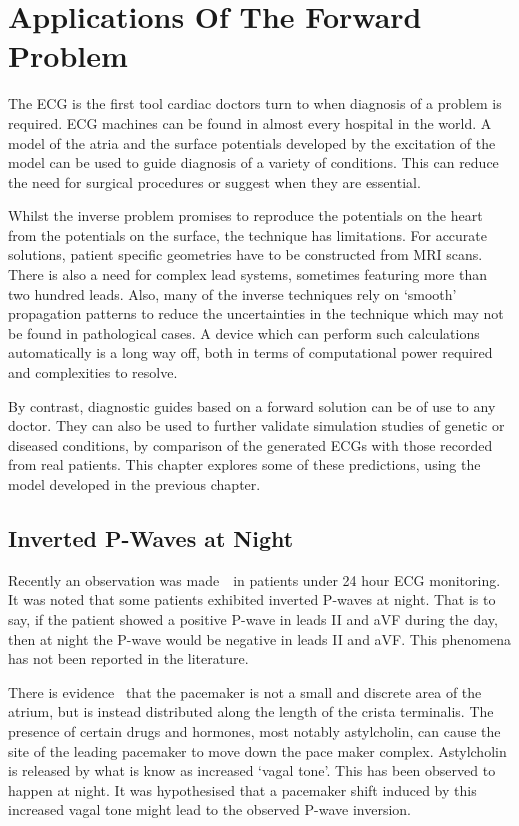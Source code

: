 \chapter{Applications Of The Forward Problem}

The ECG is the first tool cardiac doctors turn to when diagnosis of a problem is
required.
ECG machines can be found in almost every hospital in the world.
A model of the atria and the surface potentials developed by the excitation of
the model can be used to guide diagnosis of a variety of conditions.
This can reduce the need for surgical procedures or suggest when they are
essential.

Whilst the inverse problem promises to reproduce the potentials on the heart
from the potentials on the surface, the technique has limitations.
For accurate solutions, patient specific geometries have to be constructed from
MRI scans.
There is also a need for complex lead systems, sometimes featuring more than two
hundred leads.
Also, many of the inverse techniques rely on `smooth' propagation patterns to
reduce the uncertainties in the technique which may not be found in pathological
cases.
A device which can perform such calculations automatically is a long way off,
both in terms of computational power required and complexities to resolve.

By contrast, diagnostic guides based on a forward solution can be of use to any
doctor.
They can also be used to further validate simulation studies of genetic or
diseased conditions, by comparison of the generated ECGs with those recorded
from real patients.
This chapter explores some of these predictions, using the model developed in
the previous chapter.

\section{Inverted P-Waves at Night}

Recently an observation was made~\cite{BoyettPrivate}\ in patients under 24 hour
ECG monitoring.
It was noted that some patients exhibited inverted P-waves at night.
That is to say, if the patient showed a positive P-wave in leads II and aVF
during the day, then at night the P-wave would be negative in leads II and aVF.
This phenomena has not been reported in the literature.

There is evidence~\cite{Shibata2001,Boineau1988} that the pacemaker is not a
small and discrete area of the atrium, but is instead distributed along the
length of the crista terminalis.
The presence of certain drugs and hormones, most notably astylcholin, can cause
the site of the leading pacemaker to move down the pace maker complex.
Astylcholin is released by what is know as increased `vagal tone'.
This has been observed to happen at night.
It was hypothesised that a pacemaker shift induced by this increased vagal tone
might lead to the observed P-wave inversion.

